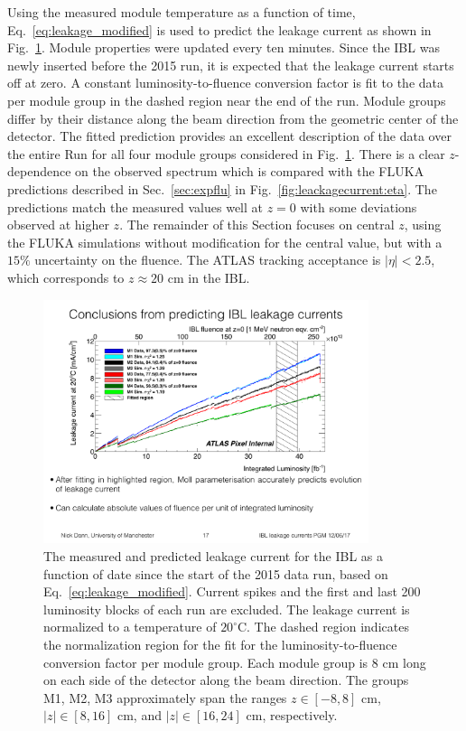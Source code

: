 Using the measured module temperature as a function of time, Eq.~\ref{eq:leakage_modified} is used to predict the leakage current as shown in Fig.~\ref{fig:leackagecurrent:beta}. Module properties were updated every ten minutes.  Since the IBL was newly inserted before the 2015 run, it is expected that the leakage current starts off at zero.  A constant luminosity-to-fluence conversion factor is fit to the data per module group in the dashed region near the end of the run.  Module groups differ by their distance along the beam direction from the geometric center of the detector.  The fitted prediction provides an excellent description of the data over the entire Run for all four module groups considered in Fig.~\ref{fig:leackagecurrent:beta}.  There is a clear $z$-dependence on the observed spectrum which is compared with the FLUKA predictions described in Sec.~\ref{sec:expflu} in Fig.~\ref{fig:leackagecurrent:eta}.  The predictions match the measured values well at $z=0$ with some deviations observed at higher $z$.  The remainder of this Section focuses on central $z$, using the FLUKA simulations without modification for the central value, but with a $15\%$ uncertainty on the fluence.  The ATLAS tracking acceptance is $|\eta|<2.5$, which corresponds to $z\approx 20$ cm in the IBL.

\begin{figure}[h!]
\centering
\includegraphics[width=0.85\textwidth]{leakagecurrent_Dann.pdf}
\caption{The measured and predicted leakage current for the IBL as a function of date since the start of the 2015 data run, based on Eq.~\ref{eq:leakage_modified}.   Current spikes and the first and last 200 luminosity blocks of each run are excluded. The leakage current is normalized to a temperature of $20^{\circ}$C. The dashed region indicates the normalization region for the fit for the luminosity-to-fluence conversion factor per module group. Each module group is $8$ cm long on each side of the detector along the beam direction.  The groups M1, M2, M3 approximately span the ranges $z\in[-8,8]$ cm, $|z|\in[8,16]$ cm, and $|z|\in [16,24]$ cm, respectively. }
\label{fig:leackagecurrent:beta}
\end{figure}

